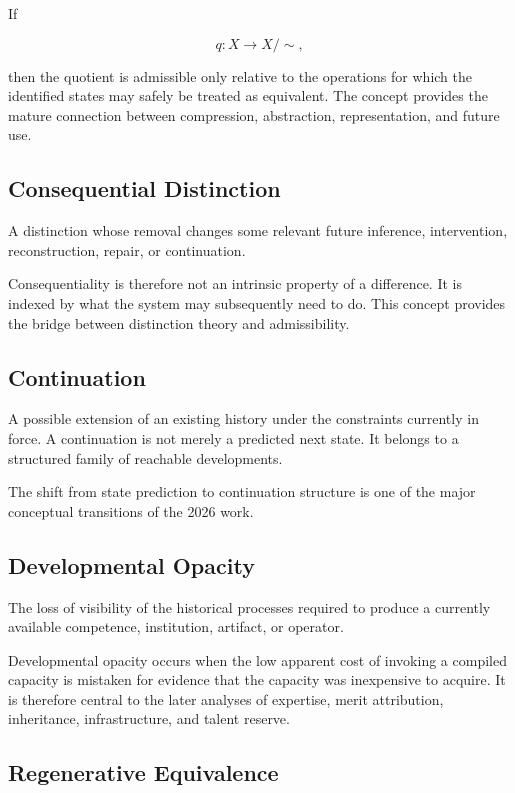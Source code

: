 \documentclass[11pt]{article}
\theoremstyle{remark}
\begin{document}
If

\[
q:X\rightarrow X/{\sim},
\]

then the quotient is admissible only relative to the operations for which the
identified states may safely be treated as equivalent. The concept provides
the mature connection between compression, abstraction, representation, and
future use.

\subsection*{Consequential Distinction}

A distinction whose removal changes some relevant future inference,
intervention, reconstruction, repair, or continuation.

Consequentiality is therefore not an intrinsic property of a difference. It is
indexed by what the system may subsequently need to do. This concept provides
the bridge between distinction theory and admissibility.

\subsection*{Continuation}

A possible extension of an existing history under the constraints currently in
force. A continuation is not merely a predicted next state. It belongs to a
structured family of reachable developments.

The shift from state prediction to continuation structure is one of the major
conceptual transitions of the 2026 work.

\subsection*{Developmental Opacity}

The loss of visibility of the historical processes required to produce a
currently available competence, institution, artifact, or operator.

Developmental opacity occurs when the low apparent cost of invoking a compiled
capacity is mistaken for evidence that the capacity was inexpensive to acquire.
It is therefore central to the later analyses of expertise, merit attribution,
inheritance, infrastructure, and talent reserve.

\subsection*{Regenerative Equivalence}
\end{document}
